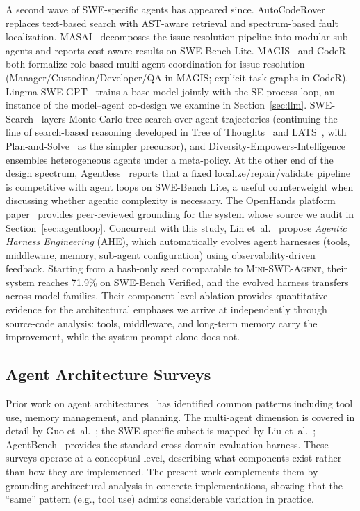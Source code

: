 \documentclass[11pt,a4paper]{article}
\newcommand{\mswe}{\textsc{Mini-SWE-Agent}\xspace}
\begin{document}
A second wave of SWE-specific agents has appeared since.
AutoCodeRover~\cite{zhang2024autocoderover} replaces text-based search with AST-aware retrieval and spectrum-based fault localization.
MASAI~\cite{arora2024masai} decomposes the issue-resolution pipeline into modular sub-agents and reports cost-aware results on SWE-Bench Lite.
MAGIS~\cite{tao2024magis} and CodeR~\cite{chen2024coder} both formalize role-based multi-agent coordination for issue resolution (Manager/Custodian/Developer/QA in MAGIS; explicit task graphs in CodeR).
Lingma SWE-GPT~\cite{ma2024lingmaswegpt} trains a base model jointly with the SE process loop, an instance of the model--agent co-design we examine in Section~\ref{sec:llm}.
SWE-Search~\cite{antoniades2025sweseach} layers Monte Carlo tree search over agent trajectories (continuing the line of search-based reasoning developed in Tree of Thoughts~\cite{yao2023tot} and LATS~\cite{zhou2024lats}, with Plan-and-Solve~\cite{wang2023planandsolve} as the simpler precursor), and Diversity-Empowers-Intelligence~\cite{zhang2024dei} ensembles heterogeneous agents under a meta-policy.
At the other end of the design spectrum, Agentless~\cite{xia2024agentless} reports that a fixed localize/repair/validate pipeline is competitive with agent loops on SWE-Bench Lite, a useful counterweight when discussing whether agentic complexity is necessary.
The OpenHands platform paper~\cite{wang2025openhands} provides peer-reviewed grounding for the system whose source we audit in Section~\ref{sec:agentloop}.
Concurrent with this study, Lin et~al.~\cite{lin2026ahe} propose \emph{Agentic Harness Engineering} (AHE), which automatically evolves agent harnesses (tools, middleware, memory, sub-agent configuration) using observability-driven feedback.
Starting from a bash-only seed comparable to \mswe{}, their system reaches 71.9\% on SWE-Bench Verified, and the evolved harness transfers across model families.
Their component-level ablation provides quantitative evidence for the architectural emphases we arrive at independently through source-code analysis: tools, middleware, and long-term memory carry the improvement, while the system prompt alone does not.

\subsection{Agent Architecture Surveys}

Prior work on agent architectures~\cite{weng2023llmagents,wang2024survey,xi2023agents} has identified common patterns including tool use, memory management, and planning.
The multi-agent dimension is covered in detail by Guo et~al.~\cite{guo2024multiagent}; the SWE-specific subset is mapped by Liu et~al.~\cite{liu2025seagents}; AgentBench~\cite{liu2024agentbench} provides the standard cross-domain evaluation harness.
These surveys operate at a conceptual level, describing what components exist rather than how they are implemented.
The present work complements them by grounding architectural analysis in concrete implementations, showing that the ``same'' pattern (e.g., tool use) admits considerable variation in practice.
\end{document}
